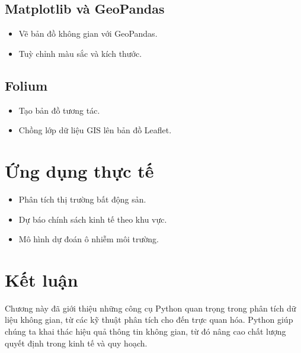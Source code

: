 \subsection{Matplotlib và GeoPandas}
\begin{itemize}
    \item Vẽ bản đồ không gian với GeoPandas.
    \item Tuỳ chỉnh màu sắc và kích thước.
\end{itemize}

\subsection{Folium}
\begin{itemize}
    \item Tạo bản đồ tương tác.
    \item Chồng lớp dữ liệu GIS lên bản đồ Leaflet.
\end{itemize}

\section{Ứng dụng thực tế}
\begin{itemize}
    \item Phân tích thị trường bất động sản.
    \item Dự báo chính sách kinh tế theo khu vực.
    \item Mô hình dự đoán ô nhiễm môi trường.
\end{itemize}

\section{Kết luận}
Chương này đã giới thiệu những công cụ Python quan trọng trong phân tích dữ liệu không gian, từ các kỹ thuật phân tích cho đến trực quan hóa. Python giúp chúng ta khai thác hiệu quả thông tin không gian, từ đó nâng cao chất lượng quyết định trong kinh tế và quy hoạch.
